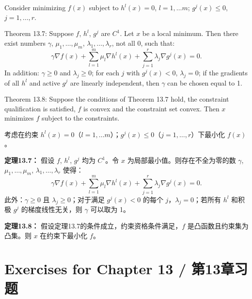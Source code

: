 \begin{original}
Consider minimizing $f(x)$ subject to $h^l(x) = 0$, $l = 1,\dots m$; $g^j(x) \le 0$, $j = 1,\dots, r$.

Theorem 13.7: Suppose $f$, $h^l$, $g^j$ are $C^1$. Let $x$ be a local minimum. Then there exist numbers $\gamma$, $\mu_1,\dots,\mu_m$, $\lambda_1,\dots,\lambda_r$, not all 0, such that:
\[
\gamma \nabla f(x) + \sum_{l=1}^m \mu_l \nabla h^l(x) + \sum_{j=1}^r \lambda_j \nabla g^j(x) = 0. \tag{13.27}
\]
In addition: $\gamma \ge 0$ and $\lambda_j \ge 0$; for each $j$ with $g^j(x) < 0$, $\lambda_j = 0$; if the gradients of all $h^l$ and active $g^j$ are linearly independent, then $\gamma$ can be chosen equal to 1.

Theorem 13.8: Suppose the conditions of Theorem 13.7 hold, the constraint qualification is satisfied, $f$ is convex and the constraint set convex. Then $x$ minimizes $f$ subject to the constraints.
\end{original}
\begin{translation}
考虑在约束 $h^l(x) = 0$（$l = 1,\dots m$）；$g^j(x) \le 0$（$j = 1,\dots, r$）下最小化 $f(x)$。

\textbf{定理13.7：} 假设 $f$, $h^l$, $g^j$ 均为 $C^1$。令 $x$ 为局部最小值。则存在不全为零的数 $\gamma$, $\mu_1,\dots,\mu_m$, $\lambda_1,\dots,\lambda_r$ 使得：
\[
\gamma \nabla f(x) + \sum_{l=1}^m \mu_l \nabla h^l(x) + \sum_{j=1}^r \lambda_j \nabla g^j(x) = 0. \tag{13.27}
\]
此外：$\gamma \ge 0$ 且 $\lambda_j \ge 0$；对于满足 $g^j(x) < 0$ 的每个 $j$，$\lambda_j = 0$；若所有 $h^l$ 和积极 $g^j$ 的梯度线性无关，则 $\gamma$ 可以取为 1。

\textbf{定理13.8：} 假设定理13.7的条件成立，约束资格条件满足，$f$ 是凸函数且约束集为凸集。则 $x$ 在约束下最小化 $f$。
\end{translation}

\section*{Exercises for Chapter 13 / 第13章习题}

